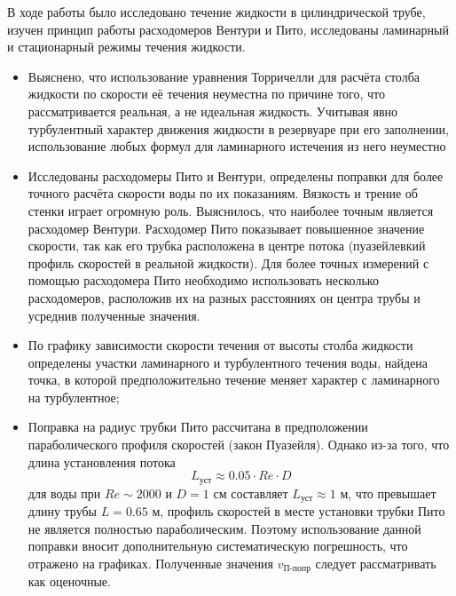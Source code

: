 \documentclass[12pt]{article}
\begin{document}
В ходе работы было исследовано течение жидкости в цилиндрической трубе, изучен принцип работы расходомеров Вентури и Пито, исследованы ламинарный и стационарный режимы течения жидкости. 
\begin{itemize}
  \item Выяснено, что использование уравнения Торричелли для расчёта столба жидкости по скорости её течения неуместна по причине того, что рассматривается реальная, а не идеальная жидкость. Учитывая явно турбулентный характер движения жидкости в резервуаре при его заполнении, использование любых формул для ламинарного истечения из него неуместно
  \item Исследованы расходомеры Пито и Вентури, определены поправки для более точного расчёта скорости воды по их показаниям. Вязкость и трение об стенки играет огромную роль. Выяснилось, что наиболее точным является расходомер Вентури. Расходомер Пито показывает повышенное значение скорости, так как его трубка расположена в центре потока (пуазейлевкий профиль скоростей в реальной жидкости). Для более точных измерений с помощью расходомера Пито необходимо использовать несколько расходомеров, расположив их на разных расстояниях он центра трубы и усреднив полученные значения.
  \item По графику зависимости скорости течения от высоты столба жидкости определены участки ламинарного и турбулентного течения воды, найдена точка, в которой предположительно течение меняет характер с ламинарного на турбулентное;
  \item Поправка на радиус трубки Пито рассчитана в предположении параболического профиля скоростей (закон Пуазейля). Однако из-за того, что длина установления потока 
\[
L_{\text{уст}} \approx 0.05 \cdot Re \cdot D
\]
для воды при \(Re \sim 2000\) и \(D = 1\) см составляет \(L_{\text{уст}} \approx 1\) м, что превышает длину трубы \(L = 0.65\) м, профиль скоростей в месте установки трубки Пито не является полностью параболическим. Поэтому использование данной поправки вносит дополнительную систематическую погрешность, что отражено на графиках. Полученные значения \(v_{\text{П-попр}}\) следует рассматривать как оценочные.
\end{itemize}
\end{document}
